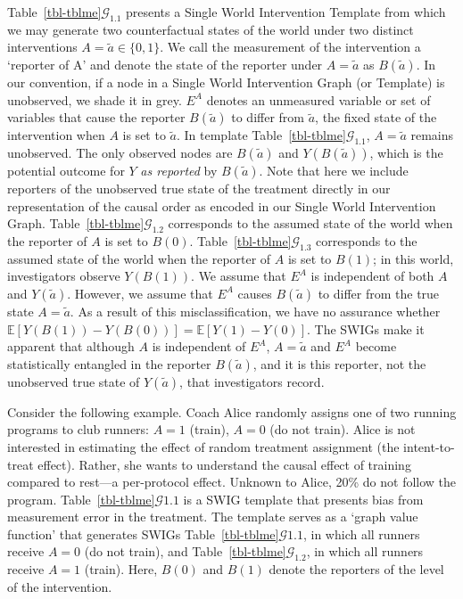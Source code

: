 \documentclass[
  single column]{article}
\begin{document}
Table~\ref{tbl-tblme}\(\mathcal{G}_{1.1}\) presents a Single World
Intervention Template from which we may generate two counterfactual
states of the world under two distinct interventions
\(A = \tilde{a} \in \{0,1\}\). We call the measurement of the
intervention a `reporter of A' and denote the state of the reporter
under \(A = \tilde{a}\) as \(B(\tilde{a})\). In our convention, if a
node in a Single World Intervention Graph (or Template) is unobserved,
we shade it in grey. \(E^A\) denotes an unmeasured variable or set of
variables that cause the reporter \(B(\tilde{a})\) to differ from
\(\tilde{a}\), the fixed state of the intervention when \(A\) is set to
\(\tilde{a}\). In template Table~\ref{tbl-tblme}\(\mathcal{G}_{1.1}\),
\(A = \tilde{a}\) remains unobserved. The only observed nodes are
\(B(\tilde{a})\) and \(Y(B(\tilde{a}))\), which is the potential outcome
for \(Y\) \emph{as reported} by \(B(\tilde{a})\). Note that here we
include reporters of the unobserved true state of the treatment directly
in our representation of the causal order as encoded in our Single World
Intervention Graph. Table~\ref{tbl-tblme}\(\mathcal{G}_{1.2}\)
corresponds to the assumed state of the world when the reporter of \(A\)
is set to \(B(0)\). Table~\ref{tbl-tblme}\(\mathcal{G}_{1.3}\)
corresponds to the assumed state of the world when the reporter of \(A\)
is set to \(B(1)\); in this world, investigators observe \(Y(B(1))\). We
assume that \(E^A\) is independent of both \(A\) and \(Y(\tilde{a})\).
However, we assume that \(E^A\) causes \(B(\tilde{a})\) to differ from
the true state \(A=\tilde{a}\). As a result of this misclassification,
we have no assurance whether
\(\mathbb{E}[Y(B(1)) - Y(B(0))] = \mathbb{E}[Y(1) - Y(0)]\). The SWIGs
make it apparent that although \(A\) is independent of \(E^A\),
\(A = \tilde{a}\) and \(E^A\) become statistically entangled in the
reporter \(B(\tilde{a})\), and it is this reporter, not the unobserved
true state of \(Y(\tilde{a})\), that investigators record.

Consider the following example. Coach Alice randomly assigns one of two
running programs to club runners: \(A = 1\) (train), \(A = 0\) (do not
train). Alice is not interested in estimating the effect of random
treatment assignment (the intent-to-treat effect). Rather, she wants to
understand the causal effect of training compared to rest---a
per-protocol effect. Unknown to Alice, 20\% do not follow the program.
Table~\ref{tbl-tblme}\(\mathcal{G}{1.1}\) is a SWIG template that
presents bias from measurement error in the treatment. The template
serves as a `graph value function' that generates SWIGs
Table~\ref{tbl-tblme}\(\mathcal{G}{1.1}\), in which all runners receive
\(A = 0\) (do not train), and
Table~\ref{tbl-tblme}\(\mathcal{G}_{1.2}\), in which all runners receive
\(A = 1\) (train). Here, \(B(0)\) and \(B(1)\) denote the reporters of
the level of the intervention.
\end{document}
